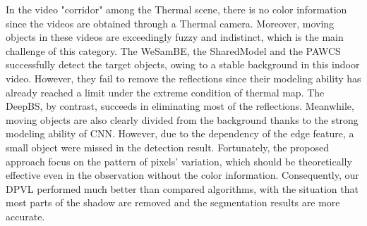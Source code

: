 \documentclass[journal]{IEEEtran}
\begin{document}
In the video "corridor" among the Thermal scene, there is no color information since the videos are obtained through a Thermal camera. 
Moreover, moving objects in these videos are exceedingly fuzzy and indistinct, which is the main challenge of this category. 
The WeSamBE, the SharedModel and the PAWCS successfully detect the target objects, owing to a stable background in this indoor video. 
However, they fail to remove the reflections since their modeling ability has already reached a limit under the extreme condition of thermal map. 
The DeepBS, by contrast, succeeds in eliminating most of the reflections. 
Meanwhile, moving objects are also clearly divided from the background thanks to the strong modeling ability of CNN. 
However, due to the dependency of the edge feature, a small object were missed in the detection result. 
Fortunately, the proposed approach focus on the pattern of pixels' variation, which should be theoretically effective even in the observation without the color information. 
Consequently, our DPVL performed much better than compared algorithms, with the situation that most parts of the shadow are removed and the segmentation results are more accurate.
\end{document}
